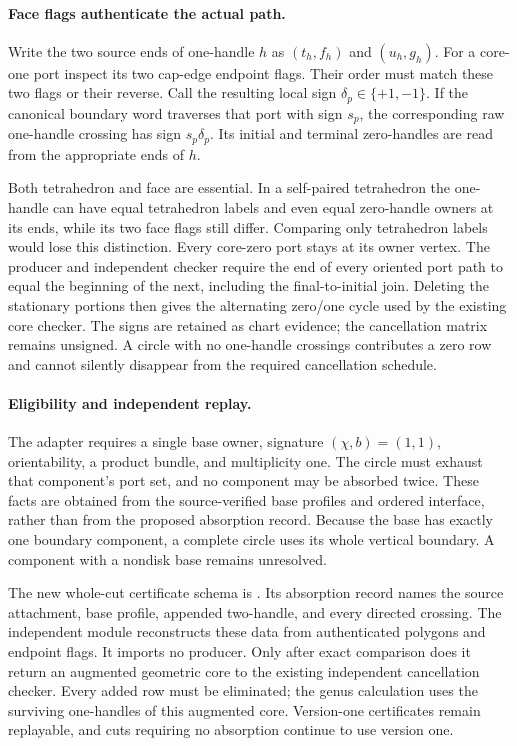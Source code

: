\paragraph{Face flags authenticate the actual path.}
Write the two source ends of one-handle $h$ as
$(t_h,f_h)$ and $(u_h,g_h)$. For a core-one port inspect its two cap-edge
endpoint flags. Their order must match these two flags or their reverse.
Call the resulting local sign $\delta_p\in\{+1,-1\}$. If the canonical
boundary word traverses that port with sign $s_p$, the corresponding raw
one-handle crossing has sign $s_p\delta_p$. Its initial and terminal
zero-handles are read from the appropriate ends of $h$.

Both tetrahedron and face are essential. In a self-paired tetrahedron the
one-handle can have equal tetrahedron labels and even equal zero-handle
owners at its ends, while its two face flags still differ. Comparing only
tetrahedron labels would lose this distinction. Every core-zero port stays
at its owner vertex. The producer and independent checker require the end
of every oriented port path to equal the beginning of the next, including
the final-to-initial join. Deleting the stationary portions then gives the
alternating zero/one cycle used by the existing core checker. The signs
are retained as chart evidence; the cancellation matrix remains unsigned.
A circle with no one-handle crossings contributes a zero row and cannot
silently disappear from the required cancellation schedule.

\paragraph{Eligibility and independent replay.}
The adapter requires a single base owner, signature $(\chi,b)=(1,1)$,
orientability, a product bundle, and multiplicity one. The circle must
exhaust that component's port set, and no component may be absorbed twice.
These facts are obtained from the source-verified base profiles and ordered
interface, rather than from the proposed absorption record. Because the
base has exactly one boundary component, a complete circle uses its whole
vertical boundary. A component with a nondisk base remains unresolved.

The new whole-cut certificate schema is
. Its absorption record names the source
attachment, base profile, appended two-handle, and every directed crossing.
The independent module  reconstructs
these data from authenticated polygons and endpoint flags. It imports no
producer. Only after exact comparison does it return an augmented geometric
core to the existing independent cancellation checker. Every added row must
be eliminated; the genus calculation uses the surviving one-handles of
this augmented core. Version-one certificates remain replayable, and cuts
requiring no absorption continue to use version one.


